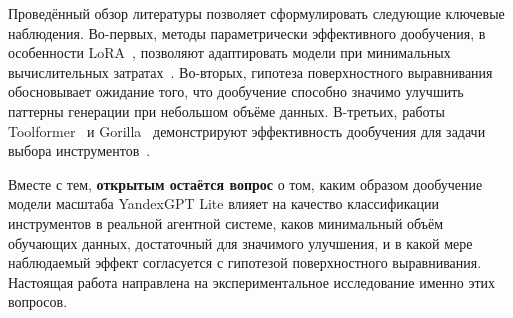 Проведённый обзор литературы позволяет сформулировать следующие ключевые наблюдения. Во-первых, методы параметрически эффективного дообучения, в особенности LoRA~\cite{hu2022lora}, позволяют адаптировать модели при минимальных вычислительных затратах~\cite{ding2023parameter}. Во-вторых, гипотеза поверхностного выравнивания~\cite{zhou2023lima, gudibande2023false} обосновывает ожидание того, что дообучение способно значимо улучшить паттерны генерации при небольшом объёме данных. В-третьих, работы Toolformer~\cite{schick2023toolformer} и Gorilla~\cite{patil2023gorilla} демонстрируют эффективность дообучения для задачи выбора инструментов~\cite{xi2023rise, qin2024toollearning}.

Вместе с тем, \textbf{открытым остаётся вопрос} о том, каким образом дообучение модели масштаба YandexGPT Lite влияет на качество классификации инструментов в реальной агентной системе, каков минимальный объём обучающих данных, достаточный для значимого улучшения, и в какой мере наблюдаемый эффект согласуется с гипотезой поверхностного выравнивания. Настоящая работа направлена на экспериментальное исследование именно этих вопросов.
